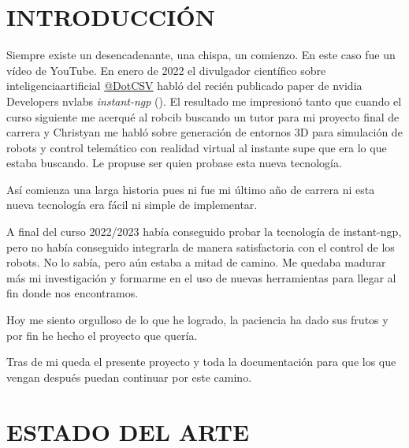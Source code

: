 \documentclass[a4paper, 12pt, spanish, twoside]{article}
\begin{document}

\newpage
\section{INTRODUCCIÓN} \label{sec:introduccion}

Siempre existe un desencadenante, una chispa, un comienzo. En este caso fue un vídeo de YouTube. En enero de 2022 el divulgador científico sobre \gls{inteligenciaartificial} \href{https://www.youtube.com/@DotCSV}{@DotCSV} habló del recién publicado paper de \gls{nvidia} Developers \gls{nvlabs} \textit{\gls{instant-ngp}} (\cite{mueller2022instant}). El resultado me impresionó tanto que cuando el curso siguiente me acerqué al \acrfull{robcib} buscando un tutor para mi proyecto final de carrera y Christyan me habló sobre generación de entornos 3D para simulación de robots y control telemático con realidad virtual al instante supe que era lo que estaba buscando. Le propuse ser quien probase esta nueva tecnología. 

Así comienza una larga historia pues ni fue mi último año de carrera ni esta nueva tecnología era fácil ni simple de implementar. 

A final del curso 2022/2023 había conseguido probar la tecnología de \gls{instant-ngp}, pero no había conseguido integrarla  de manera satisfactoria con el control de los robots. No lo sabía, pero aún estaba a mitad de camino. Me quedaba madurar más mi investigación y formarme en el uso de nuevas herramientas para llegar al fin donde nos encontramos. 

Hoy me siento orgulloso de lo que he logrado, la paciencia ha dado sus frutos y por fin he hecho el proyecto que quería.  

Tras de mi queda el presente proyecto y toda la documentación para que los que vengan después puedan continuar por este camino.  

\clearpage





\newpage
\section{ESTADO DEL ARTE} \label{sec:estado_del_arte}
\end{document}
